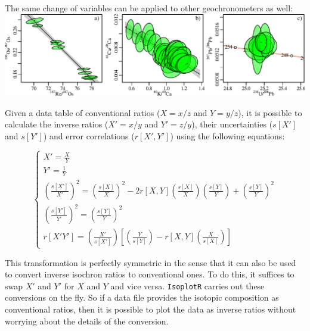 \begin{refsection}
The same change of variables can be applied to other geochronometers
as well:\\

\noindent\includegraphics[width=\textwidth]{../figures/inverrorcorrelation_edited.pdf}
\begingroup
{}
\label{fig:inverrorcorrelation}
\endgroup

Given a data table of conventional ratios ($X=x/z$ and $Y=y/z$), it is
possible to calculate the inverse ratios ($X'=x/y$ and $Y'=z/y$),
their uncertainties ($s[X']$ and $s[Y']$) and error correlations
($r[X',Y']$) using the following equations:

\begin{equation}
  \begin{cases}
    X' = \frac{X}{Y} \\
    Y' = \frac{1}{Y} \\
    \left(\frac{s[X']}{X'}\right)^2 =
    \left(\frac{s[X]}{X}\right)^2 -
    2 r[X,Y]\left(\frac{s[X]}{X}\right)\left(\frac{s[Y]}{Y}\right) +
    \left(\frac{s[Y]}{Y}\right)^2 \\
    \left(\frac{s[Y']}{Y'}\right)^2 = \left(\frac{s[Y]}{Y}\right)^2 \\
    r[X'Y'] =
    \left(\frac{X'}{s[X']}\right)
    \left[
    \left(\frac{Y}{s[Y]}\right) -
    r[X,Y]\left(\frac{X}{s[X]}\right)
    \right]
  \end{cases}
  \label{eq:transformation}
\end{equation}

This transformation is perfectly symmetric in the sense that it can
also be used to convert inverse isochron ratios to conventional
ones. To do this, it suffices to swap $X'$ and $Y'$ for $X$ and $Y$
and vice versa. \texttt{IsoplotR} carries out these conversions on the
fly. So if a data file provides the isotopic composition as
conventional ratios, then it is possible to plot the data as inverse
ratios without worrying about the details of the conversion.


\end{refsection}
